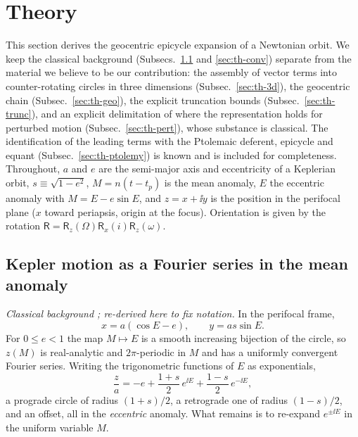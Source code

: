 \section{Theory}
\label{sec:theory}

This section derives the geocentric epicycle expansion of a Newtonian
orbit. We keep the classical background (Subsecs.~\ref{sec:th-kepler} and
\ref{sec:th-conv}) separate from the material we believe to be our
contribution: the assembly of vector terms into counter-rotating circles in
three dimensions (Subsec.~\ref{sec:th-3d}), the geocentric chain
(Subsec.~\ref{sec:th-geo}), the explicit truncation bounds
(Subsec.~\ref{sec:th-trunc}), and an explicit delimitation of where the
representation holds for perturbed motion (Subsec.~\ref{sec:th-pert}), whose
substance is classical. The identification of the leading terms with the
Ptolemaic deferent, epicycle and equant (Subsec.~\ref{sec:th-ptolemy}) is
known and is included for completeness. Throughout, $a$ and $e$ are the
semi-major axis and eccentricity of a Keplerian orbit, $s\equiv\sqrt{1-e^2}$,
$M=n(t-t_p)$ is the mean anomaly, $E$ the eccentric anomaly with
$M=E-e\sin E$, and $z=x+\ii y$ is the position in the perifocal plane
($x$ toward periapsis, origin at the focus). Orientation is given by the
rotation $\mathsf R=\mathsf R_z(\Omega)\mathsf R_x(i)\mathsf R_z(\omega)$.

\subsection{Kepler motion as a Fourier series in the mean anomaly}
\label{sec:th-kepler}

\emph{Classical background \cite{Dutka1995,Watson1944,MurrayDermott1999,BrouwerClemence1961};
re-derived here to fix notation.}
In the perifocal frame,
\begin{equation}
x=a(\cos E-e),\qquad y=as\sin E .
\label{eq:perifocal}
\end{equation}
For $0\le e<1$ the map $M\mapsto E$ is a smooth increasing bijection of the
circle, so $z(M)$ is real-analytic and $2\pi$-periodic in $M$ and has a
uniformly convergent Fourier series. Writing the trigonometric functions of
$E$ as exponentials,
\begin{equation}
\frac za=-e+\frac{1+s}{2}\,e^{\ii E}+\frac{1-s}{2}\,e^{-\ii E},
\label{eq:ellipseE}
\end{equation}
a prograde circle of radius $(1+s)/2$, a retrograde one of radius $(1-s)/2$,
and an offset, all in the \emph{eccentric} anomaly. What remains is to
re-expand $e^{\pm\ii E}$ in the uniform variable $M$.


